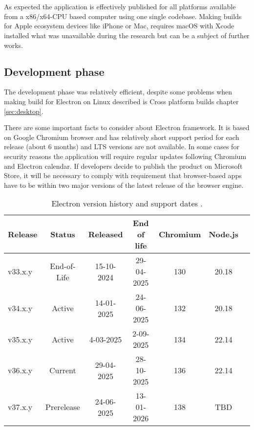 \chapter{}%
\label{ch:results}

As expected the application is effectively published for all platforms available from a x86/x64-CPU based computer using one single codebase. Making builds for Apple ecosystem devices like iPhone or Mac, requires macOS with Xcode installed what was unavailable during the research but can be a subject of further works.


\section{{Development phase}}%
\label{sec:development_evaluation}

The development phase was relatively efficient, despite some problems when making build for Electron on Linux described is Cross platform builds chapter \ref{sec:desktop}.

There are some important facts to consider about Electron framework. It is based on Google Chromium browser and has relatively short support period for each release (about 6 months) and LTS versions are not available. In some cases for security reasons the application will require regular updates following Chromium and Electron calendar. If developers decide to publish the product on Microsoft Store, it will be necessary to comply with requirement that  browser-based apps have to be within two major versions of the latest release of the browser engine\autocite{MSstoreElectron}.

\begin{table}[H]
    \centering
    \begin{tabular}{lcccccc}
        \toprule
        Release & Status & Released & End of life & Chromium & Node.js\\
        \midrule
        v33.x.y  &  End-of-Life  &  15-10-2024  &  29-04-2025  &  130  &  20.18   \\
        v34.x.y  &  Active  &  14-01-2025  &  24-06-2025  &  132  &  20.18   \\
        v35.x.y  &  Active  &  4-03-2025  &  2-09-2025  &  134  &  22.14   \\
        v36.x.y  &  Current  &  29-04-2025  &  28-10-2025  &  136  &  22.14   \\
        v37.x.y  &  Prerelease  &  24-06-2025  &  13-01-2026  &  138  &  TBD   \\ 
        \bottomrule
\end{tabular}
\caption[Electron version history]{\label{tab:electronhistory}Electron version history and support dates \autocite{ElectronReleases}.
}
\end{table}


